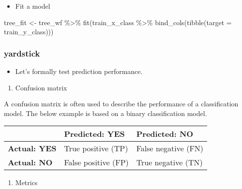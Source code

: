 \documentclass[
]{book}
\newenvironment{Shaded}{\begin{snugshade}}{\end{snugshade}}
\newcommand{\AttributeTok}[1]{\textcolor[rgb]{0.77,0.63,0.00}{#1}}
\newcommand{\FunctionTok}[1]{\textcolor[rgb]{0.00,0.00,0.00}{#1}}
\newcommand{\NormalTok}[1]{#1}
\newcommand{\OtherTok}[1]{\textcolor[rgb]{0.56,0.35,0.01}{#1}}
\newcommand{\SpecialCharTok}[1]{\textcolor[rgb]{0.00,0.00,0.00}{#1}}
\providecommand{\tightlist}{%
  \setlength{\itemsep}{0pt}\setlength{\parskip}{0pt}}
\begin{document}
\begin{itemize}
\tightlist
\item
  Fit a model
\end{itemize}

\begin{Shaded}
\begin{Highlighting}[]
\NormalTok{tree\_fit }\OtherTok{\textless{}{-}}\NormalTok{ tree\_wf }\SpecialCharTok{\%\textgreater{}\%} \FunctionTok{fit}\NormalTok{(train\_x\_class }\SpecialCharTok{\%\textgreater{}\%} \FunctionTok{bind\_cols}\NormalTok{(}\FunctionTok{tibble}\NormalTok{(}\AttributeTok{target =}\NormalTok{ train\_y\_class)))}
\end{Highlighting}
\end{Shaded}

\hypertarget{yardstick-1}{%
\subsubsection{yardstick}\label{yardstick-1}}

\begin{itemize}
\tightlist
\item
  Let's formally test prediction performance.
\end{itemize}

\begin{enumerate}
\def\labelenumi{\arabic{enumi}.}
\tightlist
\item
  Confusion matrix
\end{enumerate}

A confusion matrix is often used to describe the performance of a classification model. The below example is based on a binary classification model.

\begin{longtable}[]{@{}lll@{}}
\toprule
& Predicted: YES & Predicted: NO \\
\midrule
\endhead
\textbf{Actual: YES} & True positive (TP) & False negative (FN) \\
\textbf{Actual: NO} & False positive (FP) & True negative (TN) \\
\bottomrule
\end{longtable}

\begin{enumerate}
\def\labelenumi{\arabic{enumi}.}
\setcounter{enumi}{1}
\tightlist
\item
  Metrics
\end{enumerate}
\end{document}
